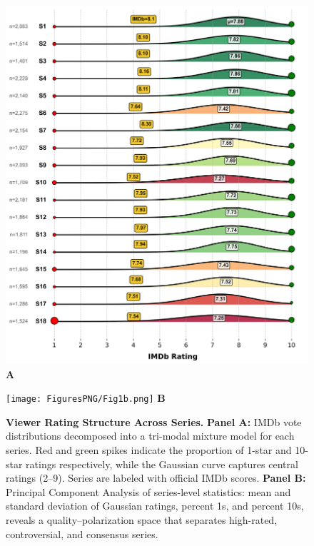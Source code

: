 \documentclass[10pt,letterpaper]{article}
\begin{document}
\begin{figure}[!h]
\centering
\begin{minipage}{0.48\linewidth}
  \centering
  \includegraphics[width=\linewidth]{FiguresPNG/Fig1a.png}
  \vspace{1mm}
  \textbf{A}
\end{minipage}
\hfill
\begin{minipage}{0.48\linewidth}
  \centering
  \texttt{[image: FiguresPNG/Fig1b.png]}
  \vspace{1mm}
  \textbf{B}
\end{minipage}
\caption{{\bf Viewer Rating Structure Across Series.}
\textbf{Panel A:} IMDb vote distributions decomposed into a tri-modal mixture model for each series. Red and green spikes indicate the proportion of 1-star and 10-star ratings respectively, while the Gaussian curve captures central ratings (2–9). Series are labeled with official IMDb scores. 
\textbf{Panel B:} Principal Component Analysis of series-level statistics: mean and standard deviation of Gaussian ratings, percent 1s, and percent 10s, reveals a quality–polarization space that separates high-rated, controversial, and consensus series.}
\label{fig:series_ratings}
\end{figure}
\end{document}
